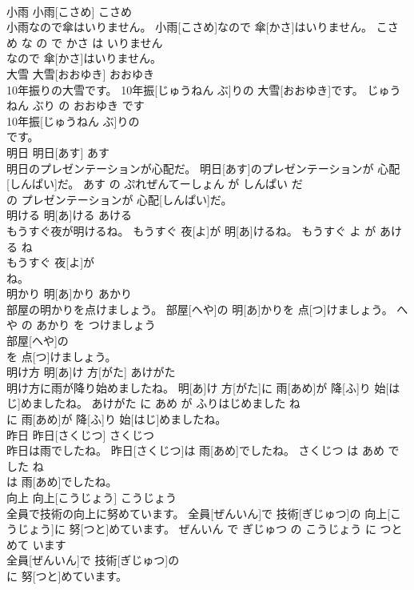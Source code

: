 \documentclass[8pt]{extreport}
\begin{document}
\begin{CJK}{UTF8}{min}
\\	小雨	小雨[こさめ]	こさめ	
\\	小雨なので傘はいりません。	小雨[こさめ]なので 傘[かさ]はいりません。	こさめ な の で かさ は いりません	
\\	なので 傘[かさ]はいりません。			
\\	大雪	大雪[おおゆき]	おおゆき	
\\	10年振りの大雪です。	10年振[じゅうねん ぶ]りの 大雪[おおゆき]です。	じゅうねん ぶり の おおゆき です	
\\	10年振[じゅうねん ぶ]りの
\\	です。			
\\	明日	明日[あす]	あす	
\\	明日のプレゼンテーションが心配だ。	明日[あす]のプレゼンテーションが 心配[しんぱい]だ。	あす の ぷれぜんてーしょん が しんぱい だ	
\\	の プレゼンテーションが 心配[しんぱい]だ。			
\\	明ける	明[あ]ける	あける	
\\	もうすぐ夜が明けるね。	もうすぐ 夜[よ]が 明[あ]けるね。	もうすぐ よ が あける ね	
\\	もうすぐ 夜[よ]が
\\	ね。			
\\	明かり	明[あ]かり	あかり	
\\	部屋の明かりを点けましょう。	部屋[へや]の 明[あ]かりを 点[つ]けましょう。	へや の あかり を つけましょう	
\\	部屋[へや]の
\\	を 点[つ]けましょう。			
\\	明け方	明[あ]け 方[がた]	あけがた	
\\	明け方に雨が降り始めましたね。	明[あ]け 方[がた]に 雨[あめ]が 降[ふ]り 始[はじ]めましたね。	あけがた に あめ が ふりはじめました ね	
\\	に 雨[あめ]が 降[ふ]り 始[はじ]めましたね。			
\\	昨日	昨日[さくじつ]	さくじつ	
\\	昨日は雨でしたね。	昨日[さくじつ]は 雨[あめ]でしたね。	さくじつ は あめ でした ね	
\\	は 雨[あめ]でしたね。			
\\	向上	向上[こうじょう]	こうじょう	
\\	全員で技術の向上に努めています。	全員[ぜんいん]で 技術[ぎじゅつ]の 向上[こうじょう]に 努[つと]めています。	ぜんいん で ぎじゅつ の こうじょう に つとめて います	
\\	全員[ぜんいん]で 技術[ぎじゅつ]の
\\	に 努[つと]めています。			

\end{CJK}
\end{document}
